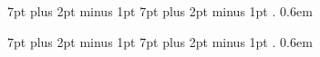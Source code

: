 \makeatletter

\pagestyle{plain}

\def\@settitle{%
  \begin{center}%
    \baselineskip14\p@\relax
    \normalfont\Large\bfseries
    \@title\par
  \end{center}%
}

\def\@setauthors{%
  \begingroup
  \def\thanks{\protect\thanks@warning}%
  \trivlist
  \centering\footnotesize \@topsep26\p@\relax
  \advance\@topsep by -\baselineskip
  \item\relax
  \author@andify\authors
  \def\\{\protect\linebreak}%
  \authors
  \ifx\@empty\contribs
  \else
    ,\penalty-3 \space \@setcontribs
    \@closetoccontribs
  \fi
  \endtrivlist
  \endgroup
}

\def\section{\@startsection{section}{1}%
  \z@{2.2ex plus 0.8ex minus 0.2ex}{1.1ex}%
  {\normalfont\centering\scshape}}
\def\subsection{\@startsection{subsection}{2}%
  \z@{1.8ex plus 0.6ex minus 0.2ex}{0.8ex}%
  {\normalfont\bfseries}}
\def\subsubsection{\@startsection{subsubsection}{3}%
  \z@{1.5ex plus 0.4ex minus 0.2ex}{0.6ex}%
  {\normalfont\itshape}}

\makeatother

%
  {7pt plus 2pt minus 1pt}%
  {7pt plus 2pt minus 1pt}%
  {\itshape}%
  {}%
  {\bfseries}%
  {.}%
  {0.6em}%
  {}%

%
  {7pt plus 2pt minus 1pt}%
  {7pt plus 2pt minus 1pt}%
  {\normalfont}%
  {}%
  {\bfseries}%
  {.}%
  {0.6em}%
  {}%

